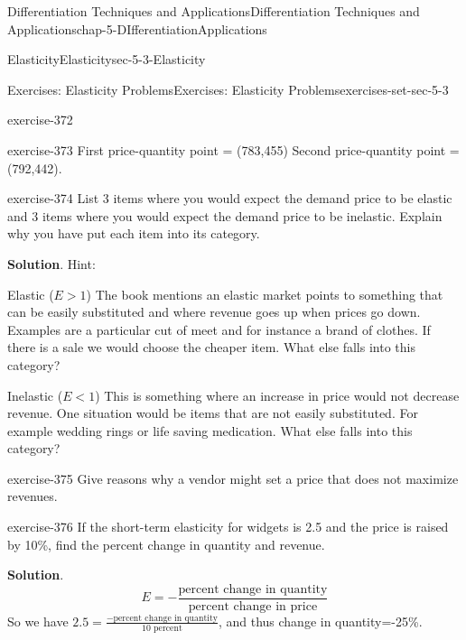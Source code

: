 \documentclass[oneside,10pt,]{book}
\numberwithin{equation}{section}
\newcommand{\lt}{<}
\newcommand{\gt}{>}
\begin{document}
\begin{chapterptx}{Differentiation Techniques and Applications}{}{Differentiation Techniques and Applications}{}{}{chap-5-DIfferentiationApplications}
\begin{sectionptx}{Elasticity}{}{Elasticity}{}{}{sec-5-3-Elasticity}
\begin{exercises-subsection-numberless}{Exercises: Elasticity Problems}{}{Exercises: Elasticity Problems}{}{}{exercises-set-sec-5-3}
\begin{divisionexercise}{9}{}{}{exercise-372}
\begin{itemize}[label=\textbullet]
\end{itemize}
\end{divisionexercise}%
\begin{divisionexercise}{10}{}{}{exercise-373}%
\hypertarget{p-2086}{}%
First price-quantity point = (\textdollar{}783,455) Second price-quantity point = (\textdollar{}792,442).%
\end{divisionexercise}%
\begin{divisionexercise}{11}{}{}{exercise-374}%
\hypertarget{p-2087}{}%
List 3 items where you would expect the demand price to be elastic and 3 items where you would expect the demand price to be inelastic.  Explain why you have put each item into its category.%
\par\smallskip%
\noindent\textbf{Solution}.\hypertarget{solution-188}{}\quad%
\hypertarget{p-2088}{}%
Hint:%
\par
\hypertarget{p-2089}{}%
Elastic (\(E \gt 1\)) The book mentions an elastic market points to something that can be easily substituted and where revenue goes up when prices go down. Examples are a particular cut of meet and for instance a brand of clothes. If there is a sale we would choose the cheaper item. What else falls into this category?%
\par
\hypertarget{p-2090}{}%
Inelastic (\(E \lt 1\)) This is something where an increase in price would not decrease revenue. One situation would be items that are not easily substituted. For example wedding rings or life saving medication. What else falls into this category?%
\end{divisionexercise}%
\begin{divisionexercise}{12}{}{}{exercise-375}%
\hypertarget{p-2091}{}%
Give reasons why a vendor might set a price that does not maximize revenues.%
\end{divisionexercise}%
\begin{divisionexercise}{13}{}{}{exercise-376}%
\hypertarget{p-2092}{}%
If the short-term elasticity for widgets is 2.5 and the price is raised by 10\%, find the percent change in quantity and revenue.%
\par\smallskip%
\noindent\textbf{Solution}.\hypertarget{solution-189}{}\quad%
%
\begin{equation*}
E=-\frac{\text{percent change in quantity}}
{\text{percent change in price}}
\end{equation*}
\hypertarget{p-2093}{}%
So we have \(2.5=\frac{-\text{percent change in quantity}}
{10 \text{ percent}}\), and thus change in quantity=-25\%.%
\par

\end{divisionexercise}
\end{exercises-subsection-numberless}
\end{sectionptx}
\end{chapterptx}
\end{document}
